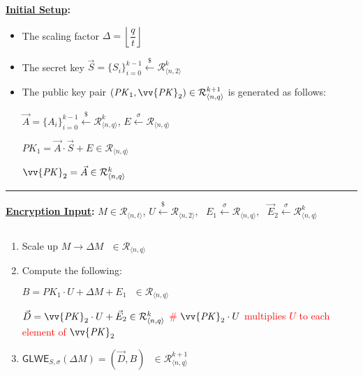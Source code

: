 \begin{tcolorbox}[title={\textbf{\tboxlabel{\ref*{subsec:glwe-enc}} GLWE Public Key Encryption}}]

\textbf{\underline{Initial Setup}:} 
\begin{itemize}
\item The scaling factor $\Delta = \left\lfloor\dfrac{q}{t}\right\rfloor$
\item The secret key $\vec{S} = \{S_i\}_{i=0}^{k-1} \xleftarrow{\$} \mathcal{R}_{\langle n, 2 \rangle}^k$
\item The public key pair $(\mathit{PK}_1, \vv{\mathit{PK}}_2) \in \mathcal{R}_{\langle n, q \rangle}^{k+1}$ is generated as follows:

$\vec{A} = \{A_i\}_{i=0}^{k-1} \xleftarrow{\$} \mathcal{R}_{\langle n, q \rangle}^k$, \text{ } $E \xleftarrow{\sigma} \mathcal{R}_{\langle n, q \rangle}$

$\mathit{PK}_1 = \vec{A} \cdot \vec{S} + E \in \mathcal{R}_{\langle n, q \rangle}$

$\vv{\mathit{PK}}_2 = \vec{A} \in \mathcal{R}_{\langle n, q \rangle}^{k}$

\end{itemize}

\par\noindent\rule{\textwidth}{0.4pt}

\textbf{\underline{Encryption Input}:} $M \in \mathcal{R}_{\langle n, t \rangle}$, \text{ } $U \xleftarrow{\$} \mathcal{R}_{\langle n,2 \rangle}, \text{ } E_1 \xleftarrow{\sigma} \mathcal{R}_{\langle n,q \rangle}, \text{ } \vec{E}_2 \xleftarrow{\sigma} \mathcal{R}_{\langle n,q \rangle}^k$

$ $

\begin{enumerate}

\item Scale up $M \longrightarrow \Delta M \text { } \in \mathcal{R}_{\langle n, q\rangle}$

\item Compute the following: 

$B = \mathit{PK}_1\cdot U + \Delta  M + E_1 \text{ } \in \mathcal{R}_{\langle n,q \rangle}$

$\vec{D} = \vv{{\mathit{PK}}}_2 \cdot U + \vec{E}_2 \in \mathcal{R}_{\langle n,q \rangle}^{k}$ \textcolor{red}{\text{ } \# $\vv{\mathit{PK}}_2 \cdot U$ multiplies $U$ to each element of $\vv{\mathit{PK}}_2$}

\item $\textsf{GLWE}_{S,\sigma}(\Delta M) = (\vec{D}, B) \text{ } \in \mathcal{R}_{\langle n,q \rangle}^{k+1}$ 




\end{enumerate}
\end{tcolorbox}
